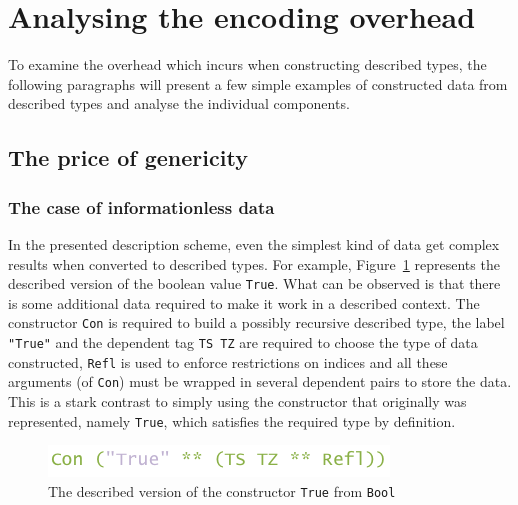 \documentclass{ituthesis}
\newcommand{\ttconstructor}[1]{\textcolor{constructor-color}{\texttt{#1}}}
\newcommand{\tttype}[1]{\textcolor{type-color}{\texttt{#1}}}
\newcommand{\ttliteral}[1]{\textcolor{literal-color}{\texttt{#1}}}
\theoremstyle{break}
\begin{document}
\section{Analysing the encoding overhead}
\label{sec:Analysingtheencodingoverhead}

To examine the overhead which incurs when constructing described types, the following paragraphs will present a few simple examples of constructed data from described types and analyse the individual components.

\subsection{The price of genericity}
\label{sub:The price of genericity}

\subsubsection{The case of informationless data}
\label{ssub:The case of informationless data}

In the presented description scheme, even the simplest kind of data get complex results when converted to described types.
For example, Figure~\ref{fig:overheadbool} represents the described version of the boolean value \ttconstructor{True}.
What can be observed is that there is some additional data required to make it work in a described context.
The constructor \ttconstructor{Con} is required to build a possibly recursive described type, the label \ttliteral{"True"} and the dependent tag \ttconstructor{TS~TZ} are required to choose the type of data constructed, \ttconstructor{Refl} is used to enforce restrictions on indices
and all these arguments (of \ttconstructor{Con}) must be wrapped in several dependent pairs to store the data.
This is a stark contrast to simply using the constructor that originally was represented, namely \ttconstructor{True}, which satisfies the required type by definition.

\begin{figure}[ht]
\begin{center}
    \includegraphics[scale=0.5]{Figures/GenericsOverheadBool.png}
\end{center}
\caption{The described version of the constructor \ttconstructor{True} from \tttype{Bool}}
\label{fig:overheadbool}
\end{figure}
\end{document}
